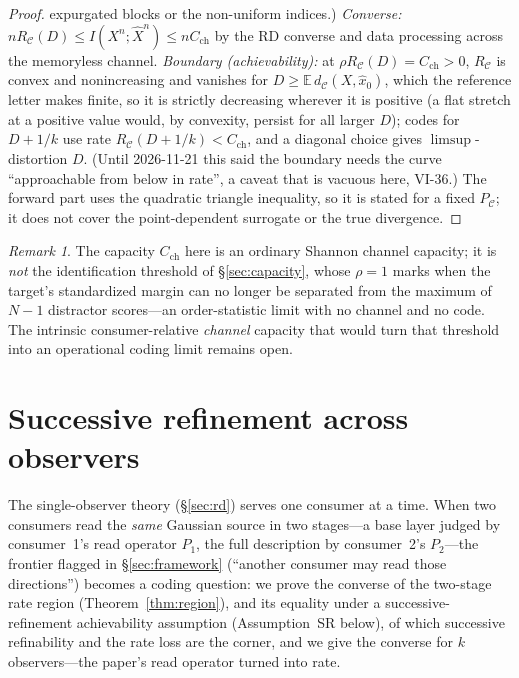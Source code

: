 \documentclass[11pt]{article}
\theoremstyle{definition}
\theoremstyle{remark}
\newtheorem*{remark}{Remark}
\newcommand{\PC}{P_{\mathcal{C}}}
\newcommand{\E}{\mathbb{E}}
\begin{document}
\begin{proof}
expurgated blocks or the non-uniform indices.)
\emph{Converse:} $nR_{\mathcal C}(D)\le I(X^n;\hat X^n)\le nC_{\mathrm{ch}}$ by the RD
converse and data processing across the memoryless channel. \emph{Boundary
(achievability):} at $\rho R_{\mathcal C}(D)=C_{\mathrm{ch}}>0$, $R_{\mathcal C}$ is
convex and nonincreasing and vanishes for $D\ge\E\,d_{\mathcal C}(X,\hat x_0)$, which the
reference letter makes finite, so it is strictly decreasing wherever it is positive (a flat
stretch at a positive value would, by convexity, persist for all larger $D$); codes for
$D+1/k$ use rate $R_{\mathcal C}(D+1/k)<C_{\mathrm{ch}}$, and a diagonal choice gives
$\limsup$-distortion $D$. (Until 2026-11-21 this said the boundary needs the curve
``approachable from below in rate'', a caveat that is vacuous here, VI-36.) The forward part uses the
quadratic triangle inequality, so it is stated for a fixed $\PC$; it does not cover the
point-dependent surrogate or the true divergence.
\end{proof}

\begin{remark}
The capacity $C_{\mathrm{ch}}$ here is an ordinary Shannon channel capacity; it is
\emph{not} the identification threshold of \S\ref{sec:capacity}, whose $\rho=1$ marks when
the target's standardized margin can no longer be separated from the maximum of $N-1$
distractor scores---an order-statistic limit with no channel and no code. The intrinsic
consumer-relative \emph{channel} capacity that would turn that threshold into an
operational coding limit remains open.
\end{remark}

\section{Successive refinement across observers}\label{sec:multiobs}

The single-observer theory (\S\ref{sec:rd}) serves one consumer at a time. When two
consumers read the \emph{same} Gaussian source in two stages---a base layer judged by
consumer~1's read operator $P_1$, the full description by consumer~2's $P_2$---the
frontier flagged in \S\ref{sec:framework} (``another consumer may read those
directions'') becomes a coding question: we prove the converse of the two-stage rate
region (Theorem~\ref{thm:region}), and its equality under a successive-refinement
achievability assumption (Assumption~SR below), of which successive refinability and the
rate loss are the corner, and we give the converse for $k$ observers---the paper's
read operator turned into rate.
\end{document}
